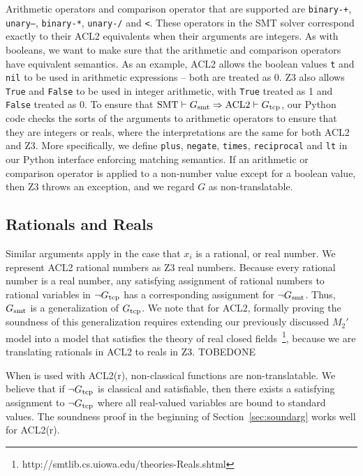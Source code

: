 Arithmetic operators and comparison operator that are supported are
\texttt{binary-+}, \texttt{unary--}, \texttt{binary-*}, \texttt{unary-/} and
\texttt{<}.
These operators in the \acs{SMT} solver correspond exactly to their ACL2
equivalents when their arguments are integers.
As with booleans, we want to make sure that the arithmetic and comparison
operators have equivalent semantics.
As an example, ACL2 allows the boolean values \texttt{t} and \texttt{nil} to be
used in arithmetic expressions -- both are treated as 0.
Z3 also allows \texttt{True} and \texttt{False} to be used in integer
arithmetic, with \texttt{True} treated as 1 and \texttt{False} treated as 0.
To ensure that $\mathrm{SMT} \vdash G_{\mathrm{smt}} \Rightarrow \mathrm{ACL2} \vdash
G_{\mathrm{tcp}}$, our Python code checks the sorts of the arguments to arithmetic
operators to ensure that they are integers or reals, where the interpretations
are the same for both ACL2 and Z3.
More specifically, we define \texttt{plus}, \texttt{negate}, \texttt{times},
\texttt{reciprocal} and \texttt{lt} in our Python interface enforcing matching
semantics. 
If an arithmetic or comparison operator is applied to a non-number value except
for a boolean value, then Z3 throws an exception, and we regard $G$ as
non-translatable.

\subsection{Rationals and Reals}\label{subsec:reals}
Similar arguments apply in the case that $x_i$ is a rational, or real number.
We represent ACL2 rational numbers as Z3 real numbers. Because every rational
number is a real number, any satisfying assignment of rational numbers to
rational variables in $\neg G_{\mathrm{tcp}}$ has a corresponding assignment for $\neg
G_{\mathrm{smt}}$. Thus, $G_{\mathrm{smt}}$ is a generalization of $G_{\mathrm{tcp}}$.
We note that for ACL2, formally proving the soundness of this generalization
requires extending our previously discussed $M_2'$ model into a model that
satisfies the theory of real closed
fields~\footnote{http://smtlib.cs.uiowa.edu/theories-Reals.shtml}, because we
are translating rationals in ACL2 to reals in Z3. TOBEDONE

When \smtlink{} is used with ACL2(r), non-classical functions are
non-translatable. We believe that if $\neg G_{\mathrm{tcp}}$ is classical and satisfiable,
then there exists a satisfying assignment to $\neg G_{\mathrm{tcp}}$ where all real-valued
variables are bound to standard values. The soundness proof in the beginning of
Section~\ref{sec:soundarg} works well for ACL2(r).

